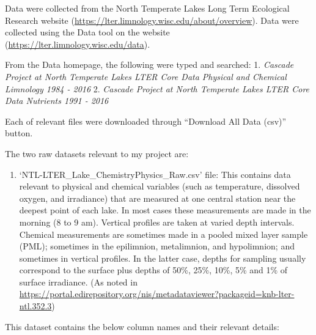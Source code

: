 \documentclass[12pt,]{article}
\providecommand{\tightlist}{%
  \setlength{\itemsep}{0pt}\setlength{\parskip}{0pt}}
\begin{document}
Data were collected from the North Temperate Lakes Long Term Ecological
Research website (\url{https://lter.limnology.wisc.edu/about/overview}).
Data were collected using the Data tool on the website
(\url{https://lter.limnology.wisc.edu/data}).

From the Data homepage, the following were typed and searched: 1.
\emph{Cascade Project at North Temperate Lakes LTER Core Data Physical
and Chemical Limnology 1984 - 2016} 2. \emph{Cascade Project at North
Temperate Lakes LTER Core Data Nutrients 1991 - 2016}

Each of relevant files were downloaded through ``Download All Data
(csv)'' button.

The two raw datasets relevant to my project are:

\begin{enumerate}
\def\labelenumi{\arabic{enumi}.}
\tightlist
\item
  `NTL-LTER\_Lake\_ChemistryPhysics\_Raw.csv' file: This contains data
  relevant to physical and chemical variables (such as temperature,
  dissolved oxygen, and irradiance) that are measured at one central
  station near the deepest point of each lake. In most cases these
  measurements are made in the morning (8 to 9 am). Vertical profiles
  are taken at varied depth intervals. Chemical measurements are
  sometimes made in a pooled mixed layer sample (PML); sometimes in the
  epilimnion, metalimnion, and hypolimnion; and sometimes in vertical
  profiles. In the latter case, depths for sampling usually correspond
  to the surface plus depths of 50\%, 25\%, 10\%, 5\% and 1\% of surface
  irradiance. (As noted in
  \url{https://portal.edirepository.org/nis/metadataviewer?packageid=knb-lter-ntl.352.3})
\end{enumerate}

This dataset contains the below column names and their relevant details:
\end{document}
